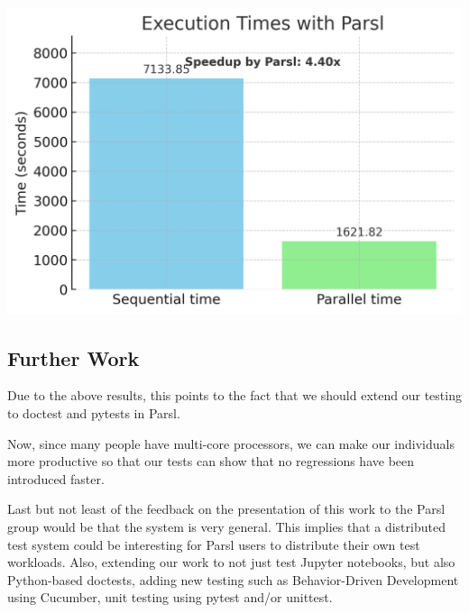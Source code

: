 \begin{center}
    \centering
    \includegraphics[width=.7\textwidth]{booktests/parsl_speedup_chart_no_x_lines.png}
    \label{fig:parsl_speedup}
\end{center}

\subsection{Further Work}

Due to the above results, this points to the fact that we should extend our testing to doctest and pytests in Parsl.

Now, since many people have multi-core processors, we can make our individuals more productive so that our tests can show that no regressions have been introduced faster.

Last but not least of the feedback on the presentation of this work to the Parsl group would be that the system is very general. This implies that a distributed test system could be interesting for Parsl users to distribute their own test workloads. 
Also, extending our work to not just test Jupyter notebooks, but also Python-based doctests, adding new testing such as Behavior-Driven Development using Cucumber, unit testing using pytest and/or unittest.

